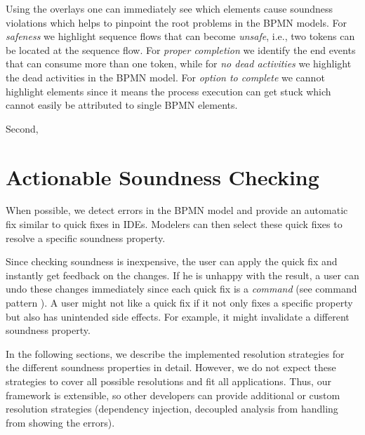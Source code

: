 \documentclass[runningheads]{llncs}
\begin{document}
Using the overlays one can immediately see which elements cause soundness violations which helps to pinpoint the root problems in the BPMN models.
For \textit{safeness} we highlight sequence flows that can become \textit{unsafe}, i.e., two tokens can be located at the sequence flow.
For \textit{proper completion} we identify the end events that can consume more than one token, while for \textit{no dead activities} we highlight the dead activities in the BPMN model.
For \textit{option to complete} we cannot highlight elements since it means the process execution can get stuck which cannot easily be attributed to single BPMN elements.

Second,

\cite{camundaservicesgmbhBpmnjsTokenSimulation2024}

\section{Actionable Soundness Checking}


When possible, we detect errors in the BPMN model and provide an automatic fix similar to quick fixes in IDEs.
Modelers can then select these quick fixes to resolve a specific soundness property.

Since checking soundness is inexpensive, the user can apply the quick fix and instantly get feedback on the changes.
If he is unhappy with the result, a user can undo these changes immediately since each quick fix is a \textit{command} (see command pattern \cite{gammaDesignPatternsElements1995}).
A user might not like a quick fix if it not only fixes a specific property but also has unintended side effects.
For example, it might invalidate a different soundness property.

In the following sections, we describe the implemented resolution strategies for the different soundness properties in detail.
However, we do not expect these strategies to cover all possible resolutions and fit all applications.
Thus, our framework is extensible, so other developers can provide additional or custom resolution strategies (dependency injection, decoupled analysis from handling from showing the errors).
\end{document}
